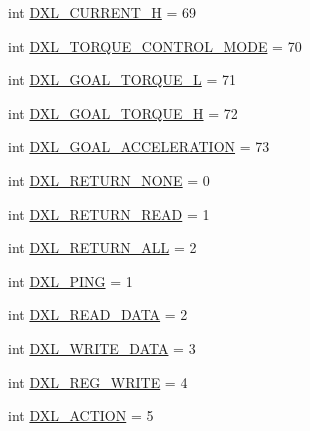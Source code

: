 \begin{DoxyCompactItemize}
\item 
int \hyperlink{namespacedynamixel__driver_1_1dynamixel__const_af093acc650c48f6dd7e6fc572a2ee0c0}{D\+X\+L\+\_\+\+C\+U\+R\+R\+E\+N\+T\+\_\+H} = 69
\item 
int \hyperlink{namespacedynamixel__driver_1_1dynamixel__const_a63e5bd9e869b773d7d3c71d0d9d957de}{D\+X\+L\+\_\+\+T\+O\+R\+Q\+U\+E\+\_\+\+C\+O\+N\+T\+R\+O\+L\+\_\+\+M\+O\+DE} = 70
\item 
int \hyperlink{namespacedynamixel__driver_1_1dynamixel__const_a94aa47dba6140f2bd8e685295ba52d67}{D\+X\+L\+\_\+\+G\+O\+A\+L\+\_\+\+T\+O\+R\+Q\+U\+E\+\_\+L} = 71
\item 
int \hyperlink{namespacedynamixel__driver_1_1dynamixel__const_af90bf4792c8c0a8bcb49e0f79cfc7605}{D\+X\+L\+\_\+\+G\+O\+A\+L\+\_\+\+T\+O\+R\+Q\+U\+E\+\_\+H} = 72
\item 
int \hyperlink{namespacedynamixel__driver_1_1dynamixel__const_a5ca78cfa4bc82eb069605736d394d99c}{D\+X\+L\+\_\+\+G\+O\+A\+L\+\_\+\+A\+C\+C\+E\+L\+E\+R\+A\+T\+I\+ON} = 73
\item 
int \hyperlink{namespacedynamixel__driver_1_1dynamixel__const_ae903876d893892c52a82554573b8d244}{D\+X\+L\+\_\+\+R\+E\+T\+U\+R\+N\+\_\+\+N\+O\+NE} = 0
\item 
int \hyperlink{namespacedynamixel__driver_1_1dynamixel__const_adb071b593dff6e1fa4202b595fe6a746}{D\+X\+L\+\_\+\+R\+E\+T\+U\+R\+N\+\_\+\+R\+E\+AD} = 1
\item 
int \hyperlink{namespacedynamixel__driver_1_1dynamixel__const_ad82c0d12e6133400d375d22817b48ca9}{D\+X\+L\+\_\+\+R\+E\+T\+U\+R\+N\+\_\+\+A\+LL} = 2
\item 
int \hyperlink{namespacedynamixel__driver_1_1dynamixel__const_a5b070d43a0e27ee5c92a469461a588ab}{D\+X\+L\+\_\+\+P\+I\+NG} = 1
\item 
int \hyperlink{namespacedynamixel__driver_1_1dynamixel__const_a2036882498110606ca03f4fb402b4823}{D\+X\+L\+\_\+\+R\+E\+A\+D\+\_\+\+D\+A\+TA} = 2
\item 
int \hyperlink{namespacedynamixel__driver_1_1dynamixel__const_a30e770ee3b48221ff2319bc0477683d0}{D\+X\+L\+\_\+\+W\+R\+I\+T\+E\+\_\+\+D\+A\+TA} = 3
\item 
int \hyperlink{namespacedynamixel__driver_1_1dynamixel__const_aa8e621386eeda464b14cf568d24c674e}{D\+X\+L\+\_\+\+R\+E\+G\+\_\+\+W\+R\+I\+TE} = 4
\item 
int \hyperlink{namespacedynamixel__driver_1_1dynamixel__const_a3651cbf02f17d84d15adf7bb4cb6ff6a}{D\+X\+L\+\_\+\+A\+C\+T\+I\+ON} = 5
\item 

\end{DoxyCompactItemize}
